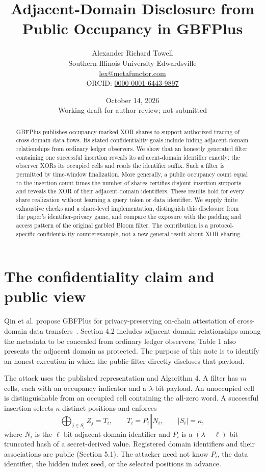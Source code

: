 \documentclass[11pt]{article}
\title{Adjacent-Domain Disclosure from Public Occupancy in GBFPlus}
\author{Alexander Richard Towell\\
\small Southern Illinois University Edwardsville\\
\small \href{mailto:lex@metafunctor.com}{lex@metafunctor.com}\\
\small ORCID: \href{https://orcid.org/0000-0001-6443-9897}{0000-0001-6443-9897}}
\date{October 14, 2026\\\small Working draft for author review; not submitted}
\begin{document}
\maketitle
\begin{abstract}
GBFPlus publishes occupancy-marked XOR shares to support authorized tracing
of cross-domain data flows. Its stated confidentiality goals include hiding
adjacent-domain relationships from ordinary ledger observers. We show that an
honestly generated filter containing one successful insertion reveals its
adjacent-domain identifier exactly: the observer XORs its occupied cells and
reads the identifier suffix. Such a filter is permitted by time-window
finalization. More generally, a public occupancy count equal to the insertion
count times the number of shares certifies disjoint insertion supports and
reveals the XOR of their adjacent-domain identifiers. These results hold for
every share realization without learning a query token or data identifier.
We supply finite exhaustive checks and a share-level implementation, distinguish
this disclosure from the paper's identifier-privacy game, and compare the
exposure with the padding and access pattern of the original garbled Bloom
filter. The contribution is a protocol-specific confidentiality counterexample,
not a new general result about XOR sharing.
\end{abstract}

\section{The confidentiality claim and public view}

Qin et al. propose GBFPlus for privacy-preserving on-chain attestation of
cross-domain data transfers~\cite{qin2026gbfplus}. Section 4.2 includes adjacent
domain relationships among the metadata to be concealed from ordinary ledger
observers; Table 1 also presents the adjacent domain as protected. The purpose
of this note is to identify an honest execution in which the public filter
directly discloses that payload.

The attack uses the published representation and Algorithm 4. A filter has
$m$ cells, each with an occupancy indicator and a $\lambda$-bit payload. An
unoccupied cell is distinguishable from an occupied cell containing the all-zero
word. A successful insertion selects $\kappa$ distinct positions and enforces
\begin{equation}
  \bigoplus_{j\in S_i} Z_j = T_i,
  \qquad T_i=P_i\mathbin\Vert N_i, \qquad |S_i|=\kappa,
  \label{eq:row}
\end{equation}
where $N_i$ is the $\ell$-bit adjacent-domain identifier and $P_i$ is a
$(\lambda-\ell)$-bit truncated hash of a secret-derived value. Registered
domain identifiers and their associations are public (Section 5.1).
The attacker need not know $P_i$, the data identifier, the hidden index seed,
or the selected positions in advance.
\end{document}

